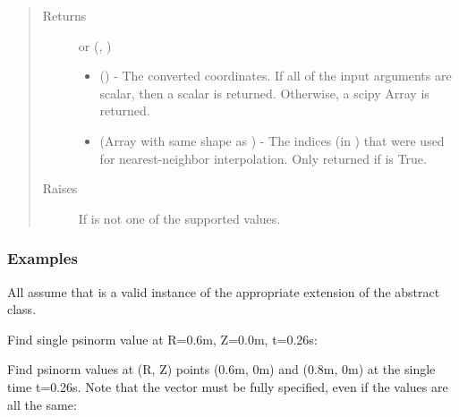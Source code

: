 \documentclass[letterpaper,10pt,english]{sphinxmanual}
\begin{document}
\begin{fulllineitems}
\begin{fulllineitems}
\begin{quote}
\begin{description}
\begin{itemize}
\end{itemize}

\item[{Returns}] \leavevmode

 or (, )
\begin{itemize}
\item {} 
 () - The converted coordinates. If
all of the input arguments are scalar, then a scalar is returned.
Otherwise, a scipy Array is returned.

\item {} 
 (Array with same shape as ) - The indices
(in ) that were used for
nearest-neighbor interpolation. Only returned if  is
True.

\end{itemize}


\item[{Raises}] \leavevmode
{} \textendash{} If  is not one of the supported values.

\end{description}\end{quote}
\subsubsection*{Examples}

All assume that  is a valid instance of the appropriate
extension of the {\hyperref[\detokenize{eqtools:eqtools.core.Equilibrium}]{}} abstract class.

Find single psinorm value at R=0.6m, Z=0.0m, t=0.26s:

\begin{sphinxVerbatim}[commandchars=\\\{\}]
     
\end{sphinxVerbatim}

Find psinorm values at (R, Z) points (0.6m, 0m) and (0.8m, 0m) at the
single time t=0.26s. Note that the  vector must be fully specified,
even if the values are all the same:


\end{fulllineitems}
\end{fulllineitems}
\end{document}
